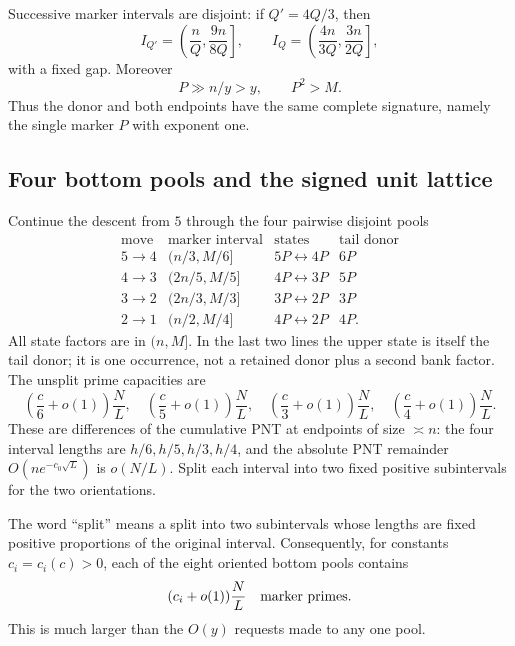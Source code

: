 \documentclass[11pt]{article}
\numberwithin{equation}{section}
\theoremstyle{definition}
\theoremstyle{remark}
\newcommand{\1}{\mathbf 1}
\begin{document}
Successive marker intervals are disjoint: if \(Q'=4Q/3\), then
\[
 I_{Q'}=\left(\frac nQ,\frac{9n}{8Q}\right],\qquad
 I_Q=\left(\frac{4n}{3Q},\frac{3n}{2Q}\right],
\]
with a fixed gap.  Moreover
\begin{equation}
                         P\gg n/y>y,\qquad P^2>M.
 \label{eq:bank-marker-is-rough}
\end{equation}
Thus the donor and both endpoints have the same complete signature,
namely the single marker \(P\) with exponent one.

\subsection{Four bottom pools and the signed unit lattice}
\label{subsec:bank-bottom-lattice}

Continue the descent from \(5\) through the four pairwise disjoint pools
\begin{equation}
\begin{array}{c|c|c|c}
\text{move}&\text{marker interval}&\text{states}&\text{tail donor}\\ \hline
5\to4&(n/3,M/6]&5P\leftrightarrow4P&6P\\
4\to3&(2n/5,M/5]&4P\leftrightarrow3P&5P\\
3\to2&(2n/3,M/3]&3P\leftrightarrow2P&3P\\
2\to1&(n/2,M/4]&4P\leftrightarrow2P&4P.
\end{array}
\label{eq:bank-four-bottom-pools}
\end{equation}
All state factors are in \((n,M]\).  In the last two lines the upper state
is itself the tail donor; it is one occurrence, not a retained donor plus
a second bank factor.  The unsplit prime capacities are
\begin{equation}
 \left(\frac c6+o(1)\right)\frac NL,\quad
 \left(\frac c5+o(1)\right)\frac NL,\quad
 \left(\frac c3+o(1)\right)\frac NL,\quad
 \left(\frac c4+o(1)\right)\frac NL.
 \label{eq:bank-bottom-capacities}
\end{equation}
These are differences of the cumulative PNT at endpoints of size
\(\asymp n\): the four interval lengths are
\(h/6,h/5,h/3,h/4\), and the absolute PNT remainder
\(O(ne^{-c_0\sqrt L})\) is \(o(N/L)\).
Split each interval into two fixed positive subintervals for the two
orientations.

The word ``split'' means a split into two subintervals whose lengths are
fixed positive proportions of the original interval.  Consequently, for
constants \(c_i=c_i(c)>0\), each of the eight oriented bottom pools
contains
\begin{equation}
             (c_i+o(1))\frac{N}{L}
             \quad\hbox{marker primes}.
 \label{eq:bank-oriented-bottom-capacities}
\end{equation}
This is much larger than the \(O(y)\) requests made to any one pool.
\end{document}
